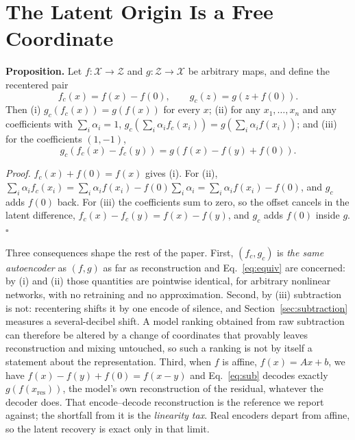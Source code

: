 \documentclass[conference]{IEEEtran}
\newcommand{\secref}[1]{Section~\ref{#1}}
\begin{document}
\section{The Latent Origin Is a Free Coordinate}\label{sec:origin}

\noindent\textbf{Proposition.} Let $f:\mathcal{X}\to\mathcal{Z}$ and
$g:\mathcal{Z}\to\mathcal{X}$ be arbitrary maps, and define the recentered
pair
\begin{equation}
  f_c(x)=f(x)-f(0), \qquad g_c(z)=g\!\left(z+f(0)\right).
  \label{eq:recenter}
\end{equation}
Then (i) $g_c(f_c(x))=g(f(x))$ for every $x$; (ii) for any $x_1,\dots,x_n$ and
any coefficients with $\sum_i\alpha_i=1$,
$g_c\!\left(\sum_i\alpha_i f_c(x_i)\right)=g\!\left(\sum_i\alpha_i f(x_i)\right)$;
and (iii) for the coefficients $(1,-1)$,
\begin{equation}
  g_c\!\left(f_c(x)-f_c(y)\right)=g\!\left(f(x)-f(y)+f(0)\right).
  \label{eq:sub}
\end{equation}

\noindent\emph{Proof.} $f_c(x)+f(0)=f(x)$ gives (i). For (ii),
$\sum_i\alpha_i f_c(x_i)=\sum_i\alpha_i f(x_i)-f(0)\sum_i\alpha_i
=\sum_i\alpha_i f(x_i)-f(0)$, and $g_c$ adds $f(0)$ back. For (iii) the
coefficients sum to zero, so the offset cancels in the latent difference,
$f_c(x)-f_c(y)=f(x)-f(y)$, and $g_c$ adds $f(0)$ inside $g$. $\square$

Three consequences shape the rest of the paper. First, $(f_c,g_c)$ is
\emph{the same autoencoder} as $(f,g)$ as far as reconstruction and
Eq.~\ref{eq:equiv} are concerned: by (i) and (ii) those quantities are
pointwise identical, for arbitrary nonlinear networks, with no retraining and
no approximation. Second, by (iii) subtraction is not: recentering shifts it
by one encode of silence, and \secref{sec:subtraction} measures a several-decibel
shift. A model ranking obtained from raw subtraction can therefore be altered
by a change of coordinates that provably leaves reconstruction and mixing
untouched, so such a ranking is not by itself a statement about the
representation. Third, when $f$ is affine, $f(x)=Ax+b$, we have
$f(x){-}f(y){+}f(0)=f(x{-}y)$ and Eq.~\ref{eq:sub} decodes exactly
$g(f(x_\mathrm{res}))$, the model's own reconstruction of the residual,
whatever the decoder does. That encode--decode reconstruction is the
reference we report against; the shortfall from it is the \emph{linearity
tax}. Real encoders depart from affine, so the latent recovery is exact only
in that limit.
\end{document}

